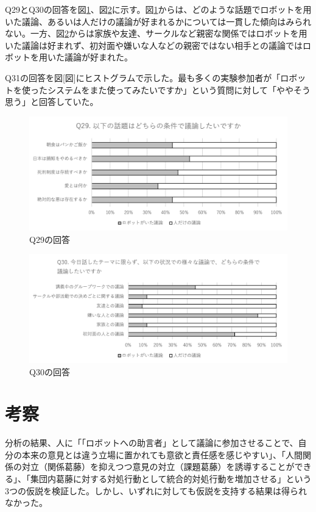 \documentclass[11pt, a4paper]{jreport} %
\begin{document}
Q29とQ30の回答を図\ref{fig:jikken3_29}、図\ref{fig:jikken3_30}に示す。図\ref{fig:jikken3_29}からは、どのような話題でロボットを用いた議論、あるいは人だけの議論が好まれるかについては一貫した傾向はみられない。一方、図\ref{fig:jikken3_30}からは家族や友達、サークルなど親密な関係ではロボットを用いた議論は好まれず、初対面や嫌いな人などの親密ではない相手との議論ではロボットを用いた議論が好まれた。


Q31の回答を図[図]にヒストグラムで示した。最も多くの実験参加者が「ロボットを使ったシステムをまた使ってみたいですか」という質問に対して「ややそう思う」と回答していた。

\begin{figure}[htbp]
\begin{center}
\includegraphics[width=150mm]{images/jikken3_29.png}
\caption{Q29の回答}
\label{fig:jikken3_29}
\end{center}
\end{figure}

\begin{figure}[htbp]
\begin{center}
\includegraphics[width=150mm]{images/jikken3_30.png}
\caption{Q30の回答}
\label{fig:jikken3_30}
\end{center}
\end{figure}


\section{考察}
分析の結果、人に「「ロボットへの助言者」として議論に参加させることで、自分の本来の意見とは違う立場に置かれても意欲と責任感を感じやすい」、「人間関係の対立（関係葛藤）を抑えつつ意見の対立（課題葛藤）を誘導することができる」、「集団内葛藤に対する対処行動として統合的対処行動を増加させる」という3つの仮説を検証した。しかし、いずれに対しても仮説を支持する結果は得られなかった。
\end{document}
